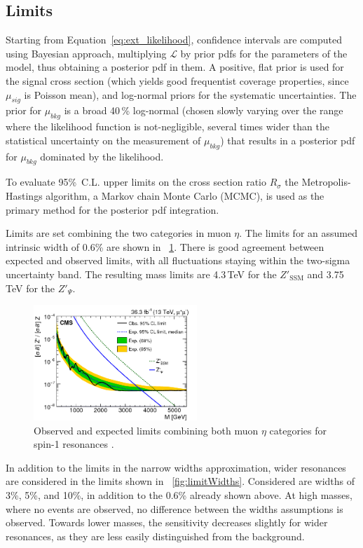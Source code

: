 \subsection{Limits} 
Starting from Equation~\ref{eq:ext_likelihood}, confidence intervals are computed using Bayesian approach, multiplying $\mathcal{L}$ by prior pdfs for the parameters of the model, thus obtaining a posterior pdf in them.
A positive, flat prior is used for the signal cross section (which yields good frequentist coverage properties, since $\mu_{sig}$ is Poisson mean), and log-normal priors for the systematic uncertainties. The prior for $\mu_{bkg}$ is a broad 40\,\% log-normal (chosen slowly varying over the range where the likelihood function is not-negligible, several times wider than the statistical uncertainty on the measurement of $\mu_{bkg}$) that results in a posterior pdf for $\mu_{bkg}$ dominated by the likelihood.

To evaluate 95\%~C.L. upper limits on the cross section ratio $R_\sigma$ the Metropolis-Hastings algorithm, a Markov chain Monte Carlo (MCMC), is used as the primary method for the posterior pdf integration.

Limits are set combining the two categories in muon $\eta$. The limits for an assumed intrinsic width of 0.6\% are shown in \figurename~\ref{fig:limit}. There is good agreement between expected and observed limits, with all fluctuations staying within the two-sigma uncertainty band. The resulting mass limits are 4.3\,TeV for the $Z'_{\mathrm{SSM}}$ and 3.75\,TeV for the $Z'_{\Psi}$. 

\begin{figure}[htbp]
\centering
\includegraphics[width=0.55\textwidth]{Images/Cap5/Limit_mm}
\caption{Observed and expected limits combining both muon $\eta$ categories for spin-1 resonances \cite{PAS}.}
\label{fig:limit}
\end{figure}

In addition to the limits in the narrow widths approximation, wider resonances are considered in the limits shown in \figurename~\ref{fig:limitWidths}. Considered are widths of 3\%, 5\%, and 10\%, in addition to the 0.6\% already shown above. At high masses, where no events are observed, no difference between the widths assumptions is observed. Towards lower masses, the sensitivity decreases slightly for wider resonances, as they are less easily distinguished from the background.

